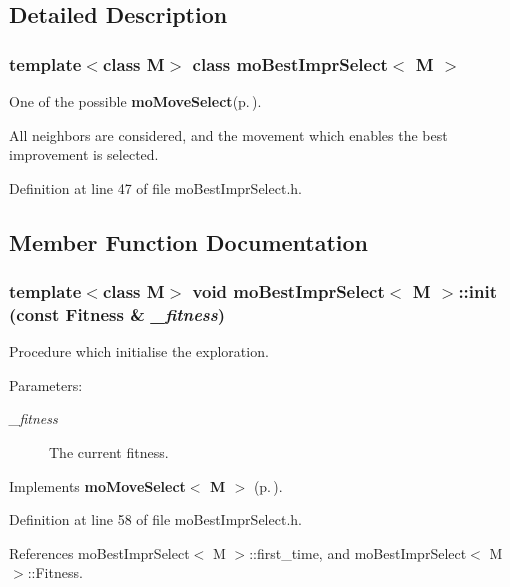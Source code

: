 \subsection{Detailed Description}
\subsubsection*{template$<$class M$>$ class mo\-Best\-Impr\-Select$<$ M $>$}

One of the possible {\bf mo\-Move\-Select}{\rm (p.\,\pageref{classmo_move_select})}. 

All neighbors are considered, and the movement which enables the best improvement is selected. 



Definition at line 47 of file mo\-Best\-Impr\-Select.h.

\subsection{Member Function Documentation}
\subsubsection{\setlength{\rightskip}{0pt plus 5cm}template$<$class M$>$ void {\bf mo\-Best\-Impr\-Select}$<$ M $>$::init (const {\bf Fitness} \& {\em \_\-fitness})\hspace{0.3cm}{\tt  [inline, virtual]}}\label{classmo_best_impr_select_a0}


Procedure which initialise the exploration. 

\begin{Desc}
\item[Parameters:]
\begin{description}
\item[{\em \_\-fitness}]The current fitness. \end{description}
\end{Desc}


Implements {\bf mo\-Move\-Select$<$ M $>$} {\rm (p.\,\pageref{classmo_move_select_a0})}.

Definition at line 58 of file mo\-Best\-Impr\-Select.h.

References mo\-Best\-Impr\-Select$<$ M $>$::first\_\-time, and mo\-Best\-Impr\-Select$<$ M $>$::Fitness.

